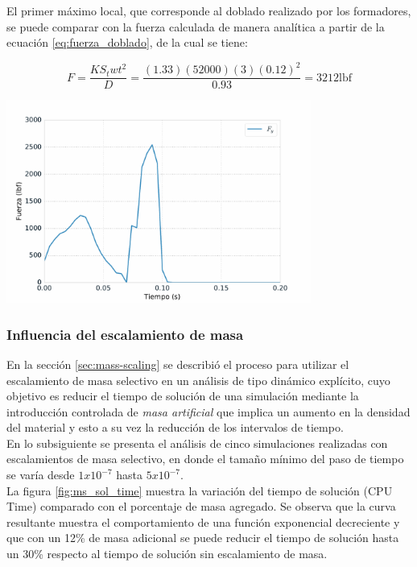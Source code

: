 El primer máximo local, que corresponde al doblado realizado por los formadores, se puede 
comparar con la fuerza calculada de manera analítica a partir de la ecuación \ref{eq:fuerza_doblado}, 
de la cual se tiene:

\begin{equation}\label{eq:fuerza_doblado}
F = \frac{K S_{t} w t^2}{D} = \frac{(1.33)(52000)(3)(0.12)^2}{0.93} = 3212 \text{lbf}
\end{equation}

\begin{center}
\includegraphics[width=0.75\textwidth]{src/ch4/nodal_force_01.pdf}
\label{fig:nodal_force_01}
\end{center}


\subsubsection{Influencia del escalamiento de masa}\label{sec:mass-scaling-results}

En la sección \ref{sec:mass-scaling} se describió el proceso para utilizar el escalamiento de masa 
selectivo en un análisis de tipo dinámico explícito, cuyo objetivo es reducir el tiempo de 
solución de una simulación mediante la introducción controlada de \textit{masa artificial} que implica 
un aumento en la densidad del material y esto a su vez la reducción de los intervalos de tiempo.\\

En lo subsiguiente se presenta el análisis de cinco simulaciones realizadas con escalamientos de 
masa selectivo, en donde el tamaño mínimo del paso de tiempo se varía desde $1x10^{-7}$ hasta 
$5x10^{-7}$.\\

La figura \ref{fig:ms_sol_time} muestra la variación del tiempo de solución (CPU Time) comparado con 
el porcentaje de masa agregado. Se observa que la curva resultante muestra el comportamiento de 
una función exponencial decreciente y que con un 12\% de masa adicional se puede reducir el tiempo 
de solución hasta un 30\% respecto al tiempo de solución sin escalamiento de masa.

